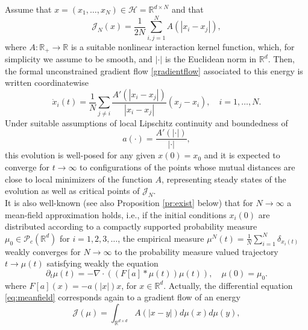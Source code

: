 Assume that $x=(x_1,\dots,x_N) \in \mathcal H= \mathbb R^{d\times N}$ and that 
$$
\mathcal J_N(x) = \frac{1}{2N} \sum_{i,j=1}^N A(| x_i -  x_j |),
$$
where $A:\mathbb R_+ \to \mathbb R$ is a suitable nonlinear interaction kernel function, which, for simplicity we assume to be smooth, and $|\cdot|$ is the Euclidean norm in $\mathbb R^d$. Then, the formal unconstrained gradient flow \eqref{gradientflow} associated to this energy is written coordinatewise
\begin{equation}\label{fdgradientflow}
\dot x_i(t) = \frac{1}{N} \sum_{j \neq i} \frac{A'(| x_i -  x_j |)}{| x_i -  x_j |} (x_j - x_i), \quad i=1,\dots,N.
\end{equation}
Under suitable assumptions of local Lipschitz continuity and boundedness of 
\begin{equation}\label{intker}
a(\cdot) = \frac{A'(|\cdot|)}{| \cdot |},
\end{equation} this evolution is well-posed for any given $x(0)=x_0$ and it is expected to converge for $t \to \infty$ to configurations of the points whose mutual distances are close to local minimizers of the function $A$, representing steady states of the evolution as well as critical points of $\mathcal J_N$.\\
It is also well-known \cite{AGS} (see also Proposition \ref{pr:exist} below) that for $N \to \infty$ a mean-field approximation holds, i.e., if the initial conditions $x_i(0)$ are distributed according to a compactly supported probability measure $\mu_0 \in \mathcal P_c(\mathbb R^d)$ for $i=1,2,3, \dots$, the empirical measure $\mu^N(t) = \frac{1}{N} \sum_{i=1}^N \delta_{x_i(t)}$ weakly converges for $N \to \infty$  to the probability measure valued trajectory $t \to \mu(t)$ satisfying weakly the equation
\begin{equation}\label{eq:meanfield}
\partial_t \mu(t) = - \nabla \cdot ((F[a] * \mu(t)) \mu(t)), \quad \mu(0)=\mu_0.
\end{equation}
where $F[a](x) =-a(| x |)x$, for $x \in \mathbb R^{d}$. Actually, the differential equation \eqref{eq:meanfield} corresponds again to a gradient flow of an energy
$$
\mathcal J (\mu) = \int_{\mathbb R^{d\times d}} A(| x-  y |) d \mu(x) d\mu(y),
$$
